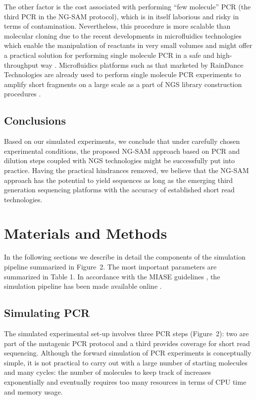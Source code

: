 \documentclass[10pt]{article}
\newcommand{\blue}[1]{{\color{blue} #1}}
\begin{document}
The other factor is the cost associated with performing ``few molecule'' PCR (the third PCR in the NG-SAM protocol), which is in itself laborious and risky in terms of contamination. Nevertheless, this procedure is more scalable than molecular cloning due to the recent developments in microfluidics technologies which enable the manipulation of reactants in very small volumes and might offer a practical solution for performing single molecule PCR in a safe and high-throughput way \cite{Tewhey2009}.
Microfluidics platforms such as \blue{that} marketed by RainDance Technologies are already used to perform single molecule PCR experiments to amplify short fragments on a large scale as a part of NGS library construction procedures \cite{Blow2009}.

\subsection*{Conclusions}

Based on our simulated experiments, we conclude that under carefully chosen experimental conditions, the proposed NG-SAM approach based on PCR and dilution steps coupled with NGS technologies might be successfully put into practice. 
Having the practical hindrances removed, we believe that the NG-SAM approach has the potential to yield sequences as long as the emerging third generation sequencing platforms with the accuracy of established short read technologies.

\section*{Materials and Methods}

In the following sections we describe in detail the \blue{components} of the simulation pipeline summarized in Figure~2. The most important parameters are summarized in Table 1. In accordance with the MIASE guidelines \cite{Waltemath11}, the simulation pipeline has been made available online \cite{pipeline}.

\subsection*{Simulating PCR}

The simulated experimental set-up involves three PCR steps (Figure~2): two are part of the mutagenic PCR protocol and a third provides coverage for short read sequencing. Although the forward simulation of PCR experiments is conceptually simple, it is not practical to carry out with a large number of starting molecules and many cycles: the number of molecules to keep track of increases exponentially and eventually requires too many resources in terms of CPU time and memory usage.
\end{document}
